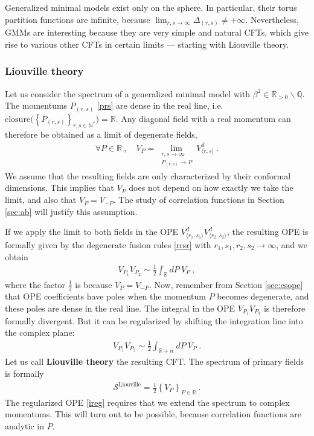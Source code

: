 \documentclass[12pt, a4paper]{article}
\newcommand{\myindex}[1]{\textbf{\boldmath #1}}
\theoremstyle{break}
\begin{document}
Generalized minimal models exist only on the sphere. In particular, their torus partition functions are infinite, because $\lim_{r,s\to\infty} \Delta_{(r,s)}\neq +\infty$. Nevertheless, GMMs are interesting because they are very simple and natural CFTs, which give rise to various other CFTs in certain limits --- starting with Liouville theory.

\subsubsection{Liouville theory}\label{sec:liou}

Let us consider the spectrum of a generalized minimal model with $\beta^2\in\mathbb{R}_{>0}\backslash\mathbb{Q}$. The momentums $P_{(r,s)}$ \eqref{prs} are dense in the real line, i.e. $\text{closure}\big(\left\{ P_{(r,s)}\right\}_{r,s\in\mathbb{N}^*}\big) = \mathbb{R}$. Any diagonal field with a real momentum can therefore be obtained as a limit of degenerate fields,
\begin{align}
 \forall P\in\mathbb{R}\ , \quad V_P = \lim_{\substack{r,s\to\infty \\ P_{(r,s)}\to P}} V^d_{\langle r,s\rangle}\ .
 \label{vplim}
\end{align}
We assume that the resulting fields are only characterized by their conformal dimensions. This implies that $V_P$ does not depend on how exactly we take the limit, and also that $V_P=V_{-P}$. The study of correlation functions in Section \ref{sec:ab} will justify this assumption.

If we apply the limit to both fields in the OPE $V^d_{\langle r_1,s_1\rangle}V^d_{\langle r_2,s_2\rangle}$, the resulting OPE is formally given by the degenerate fusion rules \eqref{rrsr} with $r_1,s_1,r_2,s_2\to\infty$, and we obtain
\begin{align}
 \boxed{V_{P_1}V_{P_2} \sim \frac12 \int_\mathbb{R} dP\ V_P} \ ,
 \label{idpv}
\end{align}
where the factor $\frac12$ is because $V_P=V_{-P}$. Now, remember from Section \ref{sec:csope} that OPE coefficients have poles when the momentum $P$ becomes degenerate, and these poles are dense in the real line. The integral in the OPE $V_{P_1}V_{P_2}$ is therefore formally divergent. But it can be regularized by shifting the integration line into the complex plane:
\begin{align}
 V_{P_1}V_{P_2} \sim \frac12 \int_{\mathbb{R}+i\epsilon} dP\ V_P\ .
 \label{ireg}
\end{align}
Let us call \myindex{Liouville theory} the resulting CFT. The spectrum of primary fields is formally
\begin{align}
 \boxed{\mathcal{S}^\text{Liouville} = \frac12 \left\{ V_P\right\}_{P\in \mathbb{R}}}\ .
 \label{sliou}
\end{align}
The regularized OPE \eqref{ireg} requires that we extend the spectrum to complex momentums. This will turn out to be possible, because correlation functions are analytic in $P$. 
\end{document}
